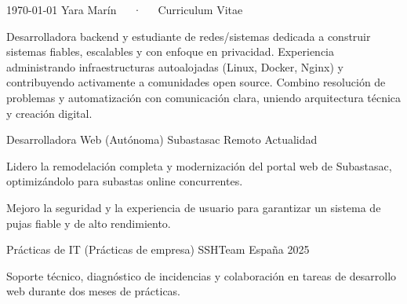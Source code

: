 \documentclass[11pt, a4paper]{awesome-cv}
\begin{document}
\makecvheader[C]

\makecvfooter
  {\today}
  {Yara Marín~~~·~~~Curriculum Vitae}
  {\thepage}



\begin{cvparagraph}
Desarrolladora backend y estudiante de redes/sistemas dedicada a construir sistemas fiables, escalables y con enfoque en privacidad. Experiencia administrando infraestructuras autoalojadas (Linux, Docker, Nginx) y contribuyendo activamente a comunidades open source. Combino resolución de problemas y automatización con comunicación clara, uniendo arquitectura técnica y creación digital.
\end{cvparagraph}


\begin{cventries}

  \cventry
    {Desarrolladora Web (Autónoma)} %
    {Subastasac} %
    {Remoto} %
    {Actualidad} %
    {
      \begin{cvitems} %
        \item {Lidero la remodelación completa y modernización del portal web de Subastasac, optimizándolo para subastas online concurrentes.}
        \item {Mejoro la seguridad y la experiencia de usuario para garantizar un sistema de pujas fiable y de alto rendimiento.}
      \end{cvitems}
    }

  \cventry
    {Prácticas de IT (Prácticas de empresa)} %
    {SSHTeam} %
    {España} %
    {2025} %
    {
      \begin{cvitems} %
        \item {Soporte técnico, diagnóstico de incidencias y colaboración en tareas de desarrollo web durante dos meses de prácticas.}
      \end{cvitems}
    }

\end{cventries}
\end{document}

